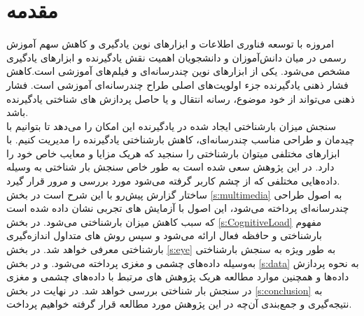 \section{مقدمه}
\label{s:introduction}
امروزه با توسعه فناوری اطلاعات و ابزارهای نوین یادگیری و کاهش سهم آموزش رسمی در میان دانش‌آموزان و دانشجویان اهمیت نقش یادگیرنده و ابزارهای یادگیری مشخص می‌شود.
یکی از ابزار‌های نوین چندرسانه‌ای و فیلم‌های آموزشی است.کاهش فشار ذهنی یادگیرنده جزء اولویت‌های اصلی طراح چندرسانه‌ای آموزشی است.
فشار ذهنی می‌تواند از خود موضوع، رسانه انتقال و یا حاصل پردازش های شناختی یادگیرنده باشد.
\\
سنجش میزان بارشناختی ایجاد شده در یادگیرنده این امکان را می‌دهد تا بتوانیم با چیدمان و طراحی مناسب چندرسانه‌ای، کاهش بارشناختی یادگیرنده را مدیریت کنیم.
با ابزارهای مختلفی میتوان بارشناختی را سنجید که هریک مزایا و معایب خاص خود را دارد. در این پژوهش سعی شده است به طور خاص سنجش بار شناختی به وسیله داده‌هایی مختلفی که از چشم کاربر گرفته می‌شود مورد بررسی و مرور قرار گیرد.
\\
ساختار گزارش پیش‌رو با این شرح است در بخش
\ref{s:multimedia}
به اصول طراحی چندرسانه‌ای پرداخته می‌شود، این اصول با آزمایش های تجربی نشان داده شده‌ است که سبب کاهش میزان بارشناختی می‌شود. در بخش 
\ref{s:CognitiveLoad}
مفهوم بارشناختی و حافظه فعال ارائه می‌شود و سپس روش های متداول اندازه‌گیری بارشناختی معرفی خواهد شد.
در بخش 
\ref{s:eye}
به طور ویژه به سنجش بارشناختی به‌وسیله داده‌های چشمی و مغزی پرداخته می‌شود.
و در بخش 
\ref{s:data}
به نحوه پردازش داده‌ها و همچنین موارد مطالعه هریک پژوهش های مرتبط با داده‌های چشمی و مغزی در سنجش بار شناختی بررسی خواهد شد.
در نهایت در بخش
\ref{s:conclusion}
به نتیجه‌گیری و جمع‌بندی آن‌چه در این پژوهش مورد مطالعه قرار گرفته خواهیم پرداخت.
